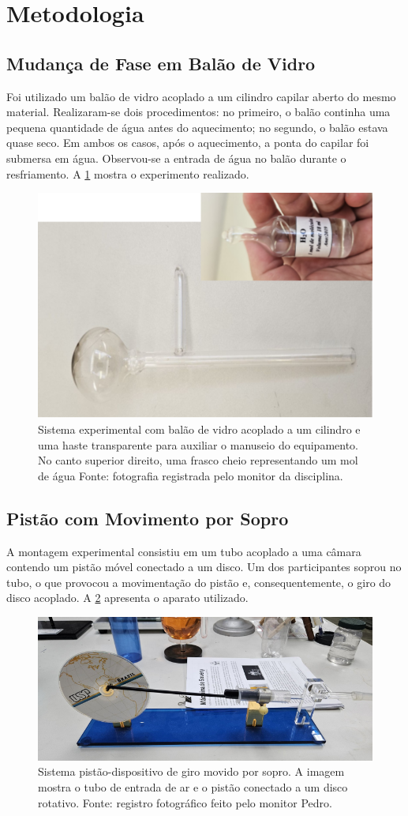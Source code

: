 \section{Metodologia}

\subsection{Mudança de Fase em Balão de Vidro}
Foi utilizado um balão de vidro acoplado a um cilindro capilar aberto do mesmo material. Realizaram-se dois procedimentos: no primeiro, o balão continha uma pequena quantidade de água antes do aquecimento; no segundo, o balão estava quase seco. Em ambos os casos, após o aquecimento, a ponta do capilar foi submersa em água. Observou-se a entrada de água no balão durante o resfriamento. A \cref{fig:balão} mostra o experimento realizado.

\begin{figure}[H]
\centering
\includegraphics[width=0.30\linewidth]{fig/balao.png}
\caption{Sistema experimental com balão de vidro acoplado a um cilindro e uma haste transparente para auxiliar o manuseio do equipamento. No canto superior direito, uma frasco cheio representando um mol de água Fonte: fotografia registrada pelo monitor da disciplina.}
\label{fig:balão}
\end{figure}

\subsection{Pistão com Movimento por Sopro}
A montagem experimental consistiu em um tubo acoplado a uma câmara contendo um pistão móvel conectado a um disco. Um dos participantes soprou no tubo, o que provocou a movimentação do pistão e, consequentemente, o giro do disco acoplado. A \cref{fig:pistao} apresenta o aparato utilizado.

\begin{figure}[H]
\centering
\includegraphics[width=0.45\linewidth]{fig/pistao.png}
\caption{Sistema pistão-dispositivo de giro movido por sopro. A imagem mostra o tubo de entrada de ar e o pistão conectado a um disco rotativo. Fonte: registro fotográfico feito pelo monitor Pedro.}
\label{fig:pistao}
\end{figure}

